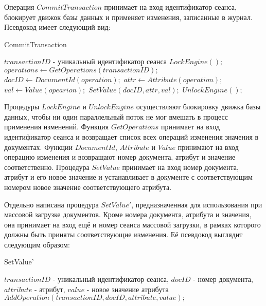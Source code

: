 \documentclass{matmex-diploma}
\begin{document}
        Операция $CommitTransaction$ принимает на вход идентификатор сеанса, блокирует движок базы данных и применяет изменения, записанные в журнал. Псевдокод имеет следующий вид:
        
        \begin{algorithm}[H]                   
        \caption{CommitTransaction}              
        \label{commitTran1}                        
            \begin{algorithmic}
                \REQUIRE $transactionID$ - уникальный идентификатор сеанса
                \STATE $LockEngine();$
                \STATE $ operations \leftarrow GetOperations(transactionID);$
                    \STATE $docID \leftarrow DocumentId(operation);$
                    \STATE $attr \leftarrow Attribute(operation);$
                    \STATE $val \leftarrow Value(opearion);$
                    \STATE $SetValue(docID, attr, val);$
                \ENDFOR
                \STATE $UnlockEngine();$
            \end{algorithmic}
        \end{algorithm}
        
        Процедуры $LockEngine$ и $UnlockEngine$ осуществляют блокировку движка базы данных, чтобы ни один параллельный поток не мог вмешать в процесс применения изменений. Функция $GetOperations$ принимает на вход идентификатор сеанса и возвращает список всех операций изменения значения в документах. Функции $DocumentId$, $Attribute$ и $Value$ принимают на вход операцию изменения и возвращают номер документа, атрибут и значение соответственно. Процедура $SetValue$ принимает на вход номер документа, атрибут и его новое значение и устанавливает в документе с соответствующим номером новое значение соответствующего атрибута.
        
        Отдельно написана процедура $SetValue'$, предназначенная для использования при массовой загрузке документов. Кроме номера документа, атрибута и значения, она принимает на вход ещё и номер сеанса массовой загрузки, в рамках которого должны быть приняты соответствующие изменения. Её псевдокод выглядит следующим образом:
        
        \begin{algorithm}[H]                   
        \caption{SetValue'}              
        \label{update}                        
            \begin{algorithmic}
                \REQUIRE $transactionID$ - уникальный идентификатор сеанса, $docID$ - номер документа, $attribute$ - атрибут, $value$ - новое значение атрибута
                \STATE $ AddOperation(transactionID, docID, attribute, value);$
            \end{algorithmic}
        \end{algorithm}
        
\end{document}

